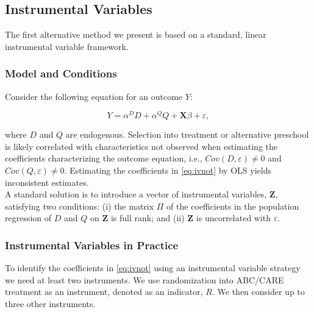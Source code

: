 \subsection{Instrumental Variables}

\noindent The first alternative method we present is based on a standard, linear instrumental variable framework.

\subsubsection{Model and Conditions}

\noindent Consider the following equation for an outcome $Y$:


\begin{equation}
Y = \alpha^D D + \alpha^Q Q + \mathbf{X} \beta + \varepsilon,
\label{eq:ivnot}
\end{equation}

\noindent where $D$ and $Q$ are endogenous. Selection into treatment or alternative preschool is likely correlated with characteristics not observed when estimating the coefficients characterizing the outcome equation, i.e., $Cov(D,\varepsilon) \neq 0$ and $Cov(Q,\varepsilon) \neq 0$. Estimating the coefficients in \eqref{eq:ivnot} by OLS yields inconsistent estimates.\\

\noindent A standard solution is to introduce a vector of instrumental variables, $\mathbf{Z}$, satisfying two conditions: (i) the matrix $\Pi$ of the coefficients in the population regression of $D$ and $Q$ on $\mathbf{Z}$ is full rank; and (ii) $\mathbf{Z}$ is uncorrelated with $\varepsilon$.


\subsubsection{Instrumental Variables in Practice}

\noindent To identify the coefficients in \eqref{eq:ivnot} using an instrumental variable strategy we need at least two instruments. We use randomization into ABC/CARE treatment as an instrument, denoted as an indicator, $R$. We then consider up to three other instruments.

